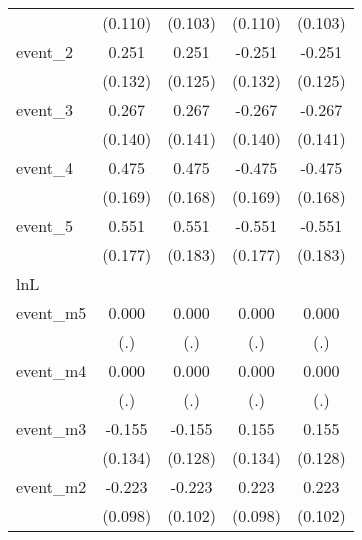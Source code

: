 {\begin{tabular}{l*{4}{c}}
            &     (0.110)         &     (0.103)         &     (0.110)         &     (0.103)         \\
[1em]
event\_2     &       0.251         &       0.251\sym{*}  &      -0.251         &      -0.251\sym{*}  \\
            &     (0.132)         &     (0.125)         &     (0.132)         &     (0.125)         \\
[1em]
event\_3     &       0.267         &       0.267         &      -0.267         &      -0.267         \\
            &     (0.140)         &     (0.141)         &     (0.140)         &     (0.141)         \\
[1em]
event\_4     &       0.475\sym{**} &       0.475\sym{**} &      -0.475\sym{**} &      -0.475\sym{**} \\
            &     (0.169)         &     (0.168)         &     (0.169)         &     (0.168)         \\
[1em]
event\_5     &       0.551\sym{**} &       0.551\sym{**} &      -0.551\sym{**} &      -0.551\sym{**} \\
            &     (0.177)         &     (0.183)         &     (0.177)         &     (0.183)         \\
\hline
lnL         &                     &                     &                     &                     \\
event\_m5    &       0.000         &       0.000         &       0.000         &       0.000         \\
            &         (.)         &         (.)         &         (.)         &         (.)         \\
[1em]
event\_m4    &       0.000         &       0.000         &       0.000         &       0.000         \\
            &         (.)         &         (.)         &         (.)         &         (.)         \\
[1em]
event\_m3    &      -0.155         &      -0.155         &       0.155         &       0.155         \\
            &     (0.134)         &     (0.128)         &     (0.134)         &     (0.128)         \\
[1em]
event\_m2    &      -0.223\sym{*}  &      -0.223\sym{*}  &       0.223\sym{*}  &       0.223\sym{*}  \\
            &     (0.098)         &     (0.102)         &     (0.098)         &     (0.102)         \\

\end{tabular}}
